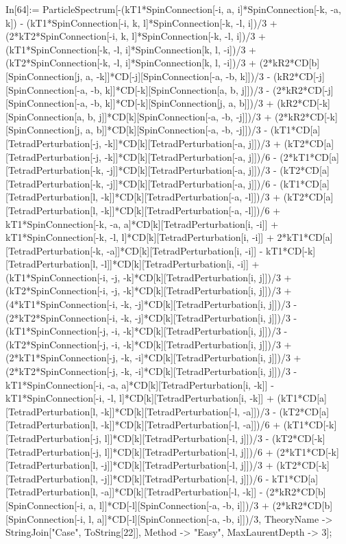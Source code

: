 In[64]:= ParticleSpectrum[-(kT1*SpinConnection[-i, a, i]*SpinConnection[-k, -a, k]) - (kT1*SpinConnection[-i, k, l]*SpinConnection[-k, -l, i])/3 + (2*kT2*SpinConnection[-i, k, l]*SpinConnection[-k, -l, i])/3 + (kT1*SpinConnection[-k, -l, i]*SpinConnection[k, l, -i])/3 + (kT2*SpinConnection[-k, -l, i]*SpinConnection[k, l, -i])/3 + (2*kR2*CD[b][SpinConnection[j, a, -k]]*CD[-j][SpinConnection[-a, -b, k]])/3 - (kR2*CD[-j][SpinConnection[-a, -b, k]]*CD[-k][SpinConnection[a, b, j]])/3 - (2*kR2*CD[-j][SpinConnection[-a, -b, k]]*CD[-k][SpinConnection[j, a, b]])/3 + (kR2*CD[-k][SpinConnection[a, b, j]]*CD[k][SpinConnection[-a, -b, -j]])/3 + (2*kR2*CD[-k][SpinConnection[j, a, b]]*CD[k][SpinConnection[-a, -b, -j]])/3 - (kT1*CD[a][TetradPerturbation[-j, -k]]*CD[k][TetradPerturbation[-a, j]])/3 + (kT2*CD[a][TetradPerturbation[-j, -k]]*CD[k][TetradPerturbation[-a, j]])/6 - (2*kT1*CD[a][TetradPerturbation[-k, -j]]*CD[k][TetradPerturbation[-a, j]])/3 - (kT2*CD[a][TetradPerturbation[-k, -j]]*CD[k][TetradPerturbation[-a, j]])/6 - (kT1*CD[a][TetradPerturbation[l, -k]]*CD[k][TetradPerturbation[-a, -l]])/3 + (kT2*CD[a][TetradPerturbation[l, -k]]*CD[k][TetradPerturbation[-a, -l]])/6 + kT1*SpinConnection[-k, -a, a]*CD[k][TetradPerturbation[i, -i]] + kT1*SpinConnection[-k, -l, l]*CD[k][TetradPerturbation[i, -i]] + 2*kT1*CD[a][TetradPerturbation[-k, -a]]*CD[k][TetradPerturbation[i, -i]] - kT1*CD[-k][TetradPerturbation[l, -l]]*CD[k][TetradPerturbation[i, -i]] + (kT1*SpinConnection[-i, -j, -k]*CD[k][TetradPerturbation[i, j]])/3 + (kT2*SpinConnection[-i, -j, -k]*CD[k][TetradPerturbation[i, j]])/3 + (4*kT1*SpinConnection[-i, -k, -j]*CD[k][TetradPerturbation[i, j]])/3 - (2*kT2*SpinConnection[-i, -k, -j]*CD[k][TetradPerturbation[i, j]])/3 - (kT1*SpinConnection[-j, -i, -k]*CD[k][TetradPerturbation[i, j]])/3 - (kT2*SpinConnection[-j, -i, -k]*CD[k][TetradPerturbation[i, j]])/3 + (2*kT1*SpinConnection[-j, -k, -i]*CD[k][TetradPerturbation[i, j]])/3 + (2*kT2*SpinConnection[-j, -k, -i]*CD[k][TetradPerturbation[i, j]])/3 - kT1*SpinConnection[-i, -a, a]*CD[k][TetradPerturbation[i, -k]] - kT1*SpinConnection[-i, -l, l]*CD[k][TetradPerturbation[i, -k]] + (kT1*CD[a][TetradPerturbation[l, -k]]*CD[k][TetradPerturbation[-l, -a]])/3 - (kT2*CD[a][TetradPerturbation[l, -k]]*CD[k][TetradPerturbation[-l, -a]])/6 + (kT1*CD[-k][TetradPerturbation[-j, l]]*CD[k][TetradPerturbation[-l, j]])/3 - (kT2*CD[-k][TetradPerturbation[-j, l]]*CD[k][TetradPerturbation[-l, j]])/6 + (2*kT1*CD[-k][TetradPerturbation[l, -j]]*CD[k][TetradPerturbation[-l, j]])/3 + (kT2*CD[-k][TetradPerturbation[l, -j]]*CD[k][TetradPerturbation[-l, j]])/6 - kT1*CD[a][TetradPerturbation[l, -a]]*CD[k][TetradPerturbation[-l, -k]] - (2*kR2*CD[b][SpinConnection[-i, a, l]]*CD[-l][SpinConnection[-a, -b, i]])/3 + (2*kR2*CD[b][SpinConnection[-i, l, a]]*CD[-l][SpinConnection[-a, -b, i]])/3, TheoryName -> StringJoin["Case", ToString[22]], Method -> "Easy", MaxLaurentDepth -> 3]; 